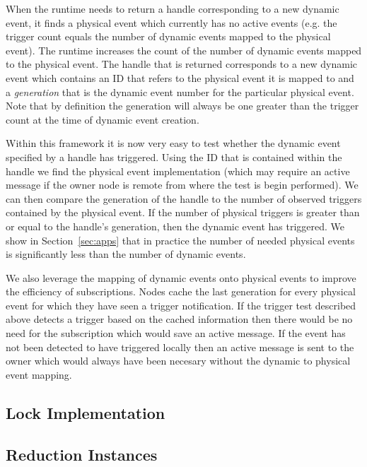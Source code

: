 When the runtime needs to return a handle corresponding to a new dynamic event, it finds
a physical event which currently has no active events (e.g. the trigger count equals the number
of dynamic events mapped to the physical event).  The runtime increases the count
of the number of dynamic events mapped to the physical event.  The handle that is returned 
corresponds to a new dynamic event which contains an ID that refers to the physical
event it is mapped to and a {\em generation} that is the dynamic event number for the particular
physical event.  Note that by definition the generation will always be one greater than the
trigger count at the time of dynamic event creation.

Within this framework it is now very easy to test whether the dynamic event specified by a
handle has triggered.  Using the ID that is contained within the handle we find the
physical event implementation (which may require an active message if the owner node is
remote from where the test is begin performed).  We can then compare the generation of
the handle to the number of observed triggers contained by the physical event.  If the
number of physical triggers is greater than or equal to the handle's generation, then
the dynamic event has triggered.  We show in Section~\ref{sec:apps} that in practice
the number of needed physical events is significantly less than the number of dynamic events.

We also leverage the mapping of dynamic events onto physical events to improve the efficiency
of subscriptions.  Nodes cache the last generation for every physical event for which they
have seen a trigger notification.  If the trigger test described above detects a trigger based
on the cached information then there would be no need for the subscription which would save an
active message.  If the event has not been detected to have
triggered locally then an active message is sent to the owner which would always have been necesary
without the dynamic to physical event mapping.

\subsection{Lock Implementation}
\label{subsec:lockimpl}

\subsection{Reduction Instances}
\label{subsec:reducimpl}
